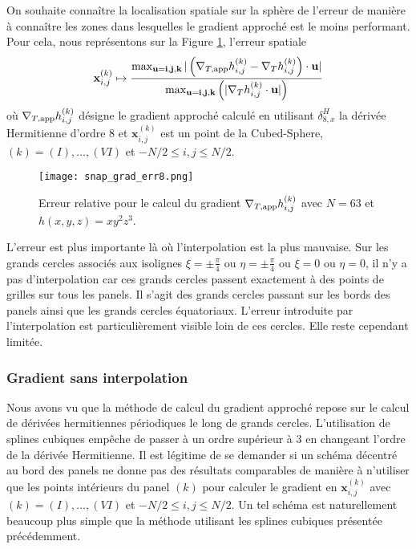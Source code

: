 On souhaite connaître la localisation spatiale sur la sphère de l'erreur de manière à connaître les zones dans lesquelles le gradient approché est le moins performant. Pour cela, nous représentons sur la Figure \ref{fig:err_grad}, l'erreur spatiale
\begin{equation}
\mathbf{x}_{i,j}^{(k)} \mapsto \dfrac{\max_{\mathbf{u}=\mathbf{i}, \mathbf{j}, \mathbf{k}} | \left( \nabla_{T,\text{app}} h_{i,j}^{(k)} - \nabla_T h_{i,j}^{(k)} \right)\cdot \mathbf{u} | }{\max_{\mathbf{u}=\mathbf{i}, \mathbf{j}, \mathbf{k}} \left(  | \nabla_T h_{i,j}^{(k)} \cdot \mathbf{u} |\right)}
\end{equation}
où $\nabla_{T,\text{app}} h_{i,j}^{(k)}$ désigne le gradient approché calculé en utilisant $\delta_{8,x}^H$ la dérivée Hermitienne d'ordre 8 et $\mathbf{x}_{i,j}^{(k)}$ est un point de la Cubed-Sphere, $(k)= (I), \ldots , (VI)$ et $-N/2 \leq i,j \leq N/2$.
\begin{figure}[htbp]
\begin{center}
\texttt{[image: snap\_grad\_err8.png]}
\end{center}
\caption{Erreur relative pour le calcul du gradient $\nabla_{T,\text{app}} h_{i,j}^{(k)}$ avec $N=63$ et $h(x,y,z)=x y^2 z^3$. }
\label{fig:err_grad}
\end{figure}
L'erreur est plus importante là où l'interpolation est la plus mauvaise. Sur les grands cercles associés aux isolignes $\xi = \pm \frac{\pi}{4}$ ou $\eta = \pm \frac{\pi}{4}$ ou $\xi = 0$ ou $\eta = 0$, il n'y a pas d'interpolation car ces grands cercles passent exactement à des points de grilles sur tous les panels. Il s'agit des grands cercles passant sur les bords des panels ainsi que les grands cercles équatoriaux. L'erreur introduite par l'interpolation est particulièrement visible loin de ces cercles. Elle reste cependant limitée.













\subsubsection{Gradient sans interpolation}

Nous avons vu que la méthode de calcul du gradient approché repose sur le calcul de dérivées hermitiennes périodiques le long de grands cercles. L'utilisation de splines cubiques empêche de passer à un ordre supérieur à 3 en changeant l'ordre de la dérivée Hermitienne. Il est légitime de se demander si un schéma décentré au bord des panels ne donne pas des résultats comparables de manière à n'utiliser que les points intérieurs du panel $(k)$ pour calculer le gradient en $\mathbf{x}_{i,j}^{(k)}$ avec $(k) = (I), \ldots ,(VI)$ et $-N/2 \leq i,j \leq N/2$. Un tel schéma est naturellement beaucoup plus simple que la méthode utilisant les splines cubiques présentée précédemment.

